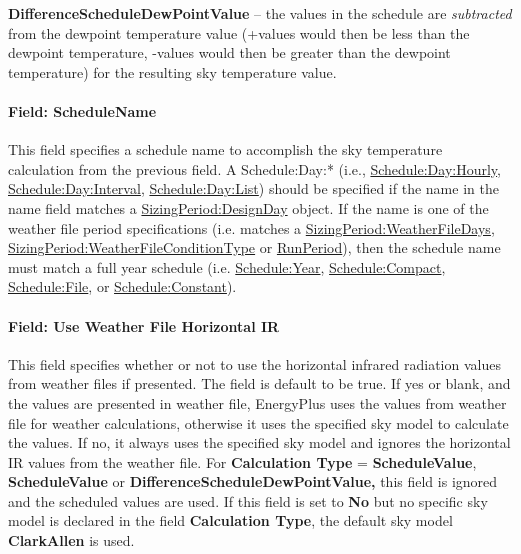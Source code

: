 \textbf{DifferenceScheduleDewPointValue} -- the values in the schedule are \emph{subtracted} from the dewpoint temperature value (+values would then be less than the dewpoint temperature, -values would then be greater than the dewpoint temperature) for the resulting sky temperature value.

\paragraph{Field: ScheduleName}\label{field-schedulename}

This field specifies a schedule name to accomplish the sky temperature calculation from the previous field. A Schedule:Day:* (i.e., \hyperref[scheduledayhourly]{Schedule:Day:Hourly}, \hyperref[scheduledayinterval]{Schedule:Day:Interval}, \hyperref[scheduledaylist]{Schedule:Day:List}) should be specified if the name in the name field matches a \hyperref[sizingperioddesignday]{SizingPeriod:DesignDay} object. If the name is one of the weather file period specifications (i.e. matches a \hyperref[sizingperiodweatherfiledays]{SizingPeriod:WeatherFileDays}, \hyperref[sizingperiodweatherfileconditiontype]{SizingPeriod:WeatherFileConditionType} or \hyperref[runperiod]{RunPeriod}), then the schedule name must match a full year schedule (i.e. \hyperref[scheduleyear]{Schedule:Year}, \hyperref[schedulecompact]{Schedule:Compact}, \hyperref[schedulefile]{Schedule:File}, or \hyperref[scheduleconstant]{Schedule:Constant}).

\paragraph{Field: Use Weather File Horizontal IR}\label{field-use-weather-file-hori-ir}

This field specifies whether or not to use the horizontal infrared radiation values from weather files if presented. The field is default to be true. If yes or blank, and the values are presented in weather file, EnergyPlus uses the values from weather file for weather calculations, otherwise it uses the specified sky model to calculate the values. If no, it always uses the specified sky model and ignores the horizontal IR values from the weather file. For \textbf{Calculation Type} = \textbf{ScheduleValue}, \textbf{ScheduleValue} or \textbf{DifferenceScheduleDewPointValue,} this field is ignored and the scheduled values are used. If this field is set to \textbf{No} but no specific sky model is declared in the field \textbf{Calculation Type}, the default sky model \textbf{ClarkAllen} is used.

